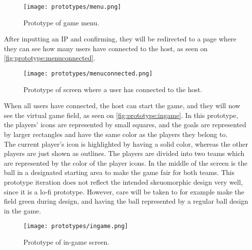 \begin{figure}[H]
    \centering
    \texttt{[image: prototypes/menu.png]}
    \caption{Prototype of game menu.}
    \label{fig:prototype:menu}
\end{figure}
\noindent
After inputting an IP and confirming, they will be redirected to a page where they can see how many users have connected to the host, as seen on \autoref{fig:prototype:menuconnected}. 

\begin{figure}[H]
    \centering
    \texttt{[image: prototypes/menuconnected.png]}
    \caption{Prototype of screen where a user has connected to the host.}
    \label{fig:prototype:menuconnected}
\end{figure}

\noindent
When all users have connected, the host can start the game, and they will now see the virtual game field, as seen on \autoref{fig:prototype:ingame}.
In this prototype, the players' icons are represented by small squares, and the goals are represented by larger rectangles and have the same color as the players they belong to. \\
The current player's icon is highlighted by having a solid color, whereas the other players are just shown as outlines. 
The players are divided into two teams which are represented by the color of the player icons.
In the middle of the screen is the ball in a designated starting area to make the game fair for both teams.
This prototype iteration does not reflect the intended skeuomorphic design very well, since it is a lo-fi prototype.
However, care will be taken to for example make the field green during design, and having the ball represented by a regular ball design in the game.
\begin{figure}[H]
    \centering
    \texttt{[image: prototypes/ingame.png]}
    \caption{Prototype of in-game screen.}
    \label{fig:prototype:ingame}
\end{figure}
